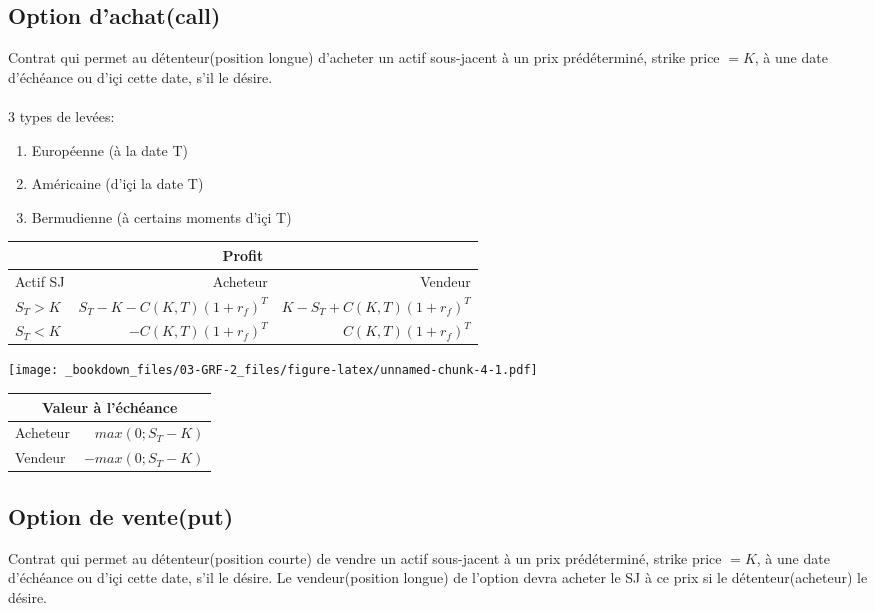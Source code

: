 \subsection{Option d'achat(call)}\label{option-dachatcall}

Contrat qui permet au détenteur(position longue) d'acheter un actif
sous-jacent à un prix prédéterminé, strike price \(=K\), à une date
d'échéance ou d'içi cette date, s'il le désire.\\
\\


3 types de levées:

\begin{enumerate}
\def\labelenumi{\arabic{enumi}.}

\item
  Européenne (à la date T)
\item
  Américaine (d'içi la date T)
\item
  Bermudienne (à certains moments d'içi T)
\end{enumerate}

\begin{tabular}{lrr}
\hline
\multicolumn{3}{c}{Profit} \\
\hline
Actif SJ & Acheteur & Vendeur \\
\hline
$S_T > K$ & $S_T - K - C(K,T)(1+r_f)^T$ & $K-S_T+C(K,T)(1+r_f)^T$\\
$S_T<K$ & $- C(K,T)(1+r_f)^T$ & $C(K,T)(1+r_f)^T$\\
\hline
\end{tabular}		


\texttt{[image: \_bookdown\_files/03-GRF-2\_files/figure-latex/unnamed-chunk-4-1.pdf]}		


\begin{tabularx}{0.5\textwidth}{Xr}
\hline
\multicolumn{2}{c}{Valeur à l'échéance}\\
\hline
Acheteur & $max(0;S_T-K)$\\
Vendeur & $-max(0;S_T-K)$\\
\hline
\end{tabularx}

\subsection{Option de vente(put)}\label{option-de-venteput}

Contrat qui permet au détenteur(position courte) de vendre un actif
sous-jacent à un prix prédéterminé, strike price \(=K\), à une date
d'échéance ou d'içi cette date, s'il le désire. Le vendeur(position
longue) de l'option devra acheter le SJ à ce prix si le
détenteur(acheteur) le désire.\\
\\


